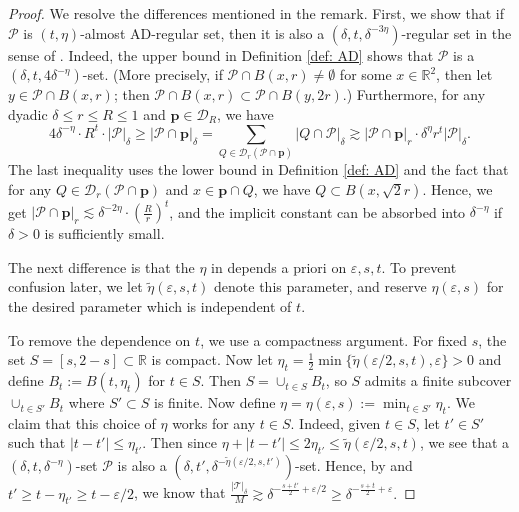 \documentclass{amsart}
\newcommand{\R}{\mathbb{R}}
\newcommand{\eps}{\varepsilon}
\newcommand{\lesim}{\lesssim}
\newcommand{\gesim}{\gtrsim}
\newcommand{\bp}{\mathbf{p}}
\newcommand{\cD}{\mathcal{D}}
\newcommand{\cT}{\mathcal{T}}
\newcommand{\cP}{\mathcal{P}}
\begin{document}
\begin{proof}
    We resolve the differences mentioned in the remark. First, we show that if $\cP$ is $(t, \eta)$-almost AD-regular set, then it is also a $(\delta, t, \delta^{-3\eta})$-regular set in the sense of \cite[Definition 4.2]{orponen2023projections}. Indeed, the upper bound in Definition \ref{def: AD} shows that $\cP$ is a $(\delta, t, 4\delta^{-\eta})$-set. (More precisely, if $\cP \cap B(x, r) \neq \emptyset$ for some $x \in \R^2$, then let $y \in \cP \cap B(x, r)$; then $\cP \cap B(x, r) \subset \cP \cap B(y, 2r)$.) Furthermore, for any dyadic $\delta \le r \le R \le 1$ and $\bp \in \cD_R$, we have
    \begin{equation*}
        4\delta^{-\eta} \cdot R^t \cdot |\cP|_\delta \ge |\cP \cap \bp|_\delta = \sum_{Q \in \cD_r (\cP \cap \bp)} |Q \cap \cP|_\delta \gesim |\cP \cap \bp|_r \cdot \delta^\eta r^t |\cP|_\delta.
    \end{equation*}
    The last inequality uses the lower bound in Definition \ref{def: AD} and the fact that for any $Q \in \cD_r (\cP \cap \bp)$ and $x \in \bp \cap Q$, we have $Q \subset B(x, \sqrt{2} r)$. Hence, we get $|\cP \cap \bp|_r \lesim \delta^{-2\eta} \cdot \left( \frac{R}{r} \right)^t$, and the implicit constant can be absorbed into $\delta^{-\eta}$ if $\delta > 0$ is sufficiently small.

    The next difference is that the $\eta$ in \cite[Theorem 5.7]{orponen2023projections} depends a priori on $\eps, s, t$. To prevent confusion later, we let $\tilde{\eta} (\eps, s, t)$ denote this parameter, and reserve $\eta(\eps, s)$ for the desired parameter which is independent of $t$.
    
    To remove the dependence on $t$, we use a compactness argument. For fixed $s$, the set $S = [s, 2-s] \subset \R$ is compact. Now let $\eta_t = \frac{1}{2} \min \{\tilde{\eta}(\eps/2, s, t), \eps \} > 0$ and define $B_t := B(t, \eta_t)$ for $t \in S$. Then $S = \cup_{t \in S} B_t$, so $S$ admits a finite subcover $\cup_{t \in S'} B_t$ where $S' \subset S$ is finite. Now define $\eta = \eta(\eps, s) := \min_{t \in S'} \eta_t$. We claim that this choice of $\eta$ works for any $t \in S$. Indeed, given $t \in S$, let $t' \in S'$ such that $|t - t'| \le \eta_{t'}$. Then since $\eta + |t - t'| \le 2\eta_{t'} \le \tilde{\eta}(\eps/2, s, t)$, we see that a $(\delta, t, \delta^{-\eta})$-set $\cP$ is also a $(\delta, t', \delta^{-\tilde{\eta}(\eps/2, s, t')})$-set. Hence, by \cite[Theorem 5.7]{orponen2023projections} and $t' \ge t - \eta_{t'} \ge t - \eps/2$, we know that $\frac{|\cT|_{\delta}}{M} \gtrsim \delta^{-\frac{s+t'}{2}+\eps/2} \ge \delta^{-\frac{s+t}{2}+\eps}.$
\end{proof}
\end{document}
